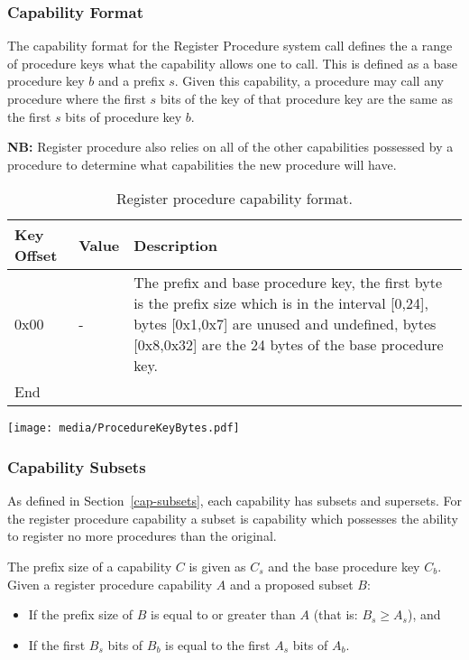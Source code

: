 \documentclass[english,a4paper]{article}
\let\oldparagraph\subsubsection
\renewcommand{\subsubsection}[1]{\oldparagraph{#1}\mbox{}}
\begin{document}
\subsubsection{Capability Format}
The capability format for the Register Procedure system call defines the a range
of procedure keys what the capability allows one to call. This is defined as a
base procedure key $b$ and a prefix $s$. Given this capability, a procedure may
call any procedure where the first $s$ bits of the key of that procedure key are
the same as the first $s$ bits of procedure key $b$.

\textbf{NB:} Register procedure also relies on all of the other capabilities
possessed by a procedure to determine what capabilities the new procedure will
have.

\begin{table}[H]
  \caption{Register procedure capability format.}
  \centering{}%
  \begin{tabular}{l|l|p{}}
    \hline
    Key Offset & Value & Description\tabularnewline
    \hline
    \hline
    0x00 & -    & The prefix and base procedure key, the first byte is the prefix
                 size which is in the interval [0,24], bytes [0x1,0x7] are
                 unused and undefined, bytes [0x8,0x32] are the 24 bytes of the
                 base procedure key. \tabularnewline
    \hline
    End &  \tabularnewline
    \hline
  \end{tabular}
\end{table}

\texttt{[image: media/ProcedureKeyBytes.pdf]}

\subsubsection{Capability Subsets}
As defined in Section~\ref{cap-subsets}, each capability has subsets and
supersets. For the register procedure capability a subset is capability which
possesses the ability to register no more procedures than the original.

The prefix size of a capability $C$ is given as $C_s$ and the base procedure key
$C_b$. Given a register procedure capability $A$ and a proposed subset $B$:
\begin{itemize}
  \item If the prefix size of $B$ is equal to or greater than $A$ (that is: $B_s
  \geq A_s$), and
  \item If the first $B_s$ bits of $B_b$ is equal to the first $A_s$ bits of
  $A_b$.
\end{itemize}
\end{document}
